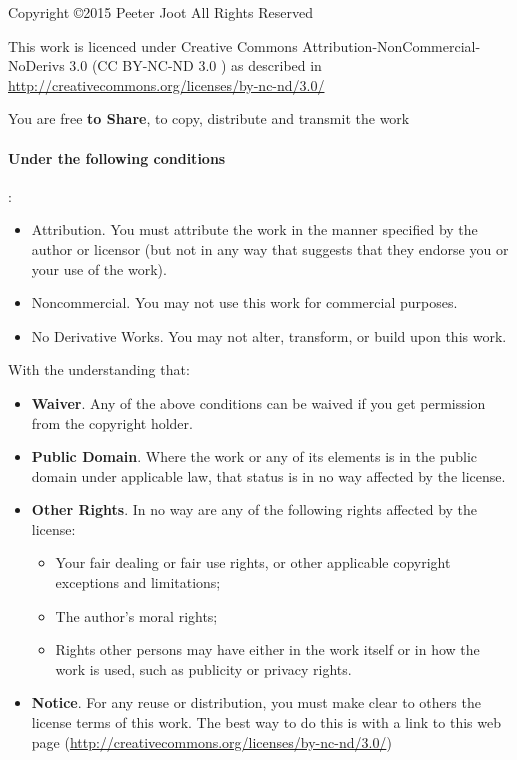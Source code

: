 Copyright \copyright 2015 Peeter Joot
All Rights Reserved

This work is licenced under Creative Commons Attribution-NonCommercial-NoDerivs 3.0 (CC BY-NC-ND 3.0 \ccbyncnd) as described in \href{http://creativecommons.org/licenses/by-nc-nd/3.0/}{http://creativecommons.org/licenses/by-nc-nd/3.0/}

You are free \textbf{to Share}, to copy, distribute and transmit the work

\paragraph{Under the following conditions}:

\begin{itemize}
\item \ccAttribution Attribution.  You must attribute the work in the manner specified by the author or licensor (but not in any way that suggests that they endorse you or your use of the work).
\item \ccNonCommercial Noncommercial. You may not use this work for commercial purposes.
\item \ccNoDerivatives No Derivative Works. You may not alter, transform, or build upon this work.
\end{itemize}

With the understanding that:

\begin{itemize}
\item \textbf{Waiver}. Any of the above conditions can be waived if you get permission from the copyright holder.
\item \textbf{Public Domain}. Where the work or any of its elements is in the public domain under applicable law, that status is in no way affected by the license.
\item \textbf{Other Rights}. In no way are any of the following rights affected by the license:

\begin{itemize}
\item Your fair dealing or fair use rights, or other applicable copyright exceptions and limitations;
\item The author's moral rights;
\item Rights other persons may have either in the work itself or in how the work is used, such as publicity or privacy rights.
\end{itemize}

\item \textbf{Notice}. For any reuse or distribution, you must make clear to others the license terms of this work. The best way to do this is with a link to this web page (\href{http://creativecommons.org/licenses/by-nc-nd/3.0/}{http://creativecommons.org/licenses/by-nc-nd/3.0/})
\end{itemize}
